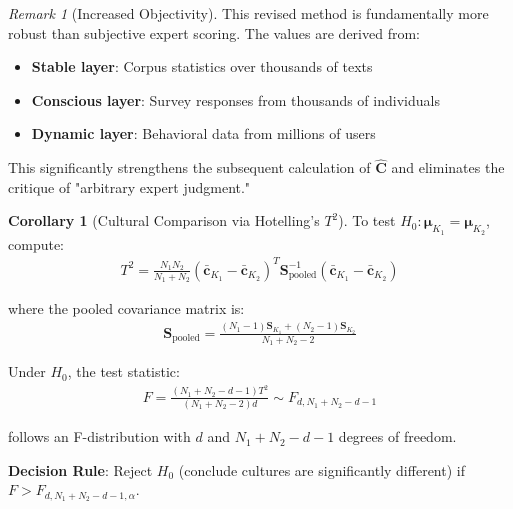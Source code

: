 \documentclass[11pt,a4paper]{article}
\theoremstyle{definition}
\newtheorem{corollary}{Corollary}[section]
\theoremstyle{remark}
\newtheorem{remark}{Remark}[section]
\newcommand{\cc}{\mathbf{c}}
\begin{document}
\begin{remark}[Increased Objectivity]
This revised method is fundamentally more robust than subjective expert scoring. The values are derived from:
\begin{itemize}
    \item \textbf{Stable layer}: Corpus statistics over thousands of texts
    \item \textbf{Conscious layer}: Survey responses from thousands of individuals
    \item \textbf{Dynamic layer}: Behavioral data from millions of users
\end{itemize}

This significantly strengthens the subsequent calculation of \(\hat{\mathbf{C}}\) and eliminates the critique of "arbitrary expert judgment."
\end{remark}

\begin{corollary}[Cultural Comparison via Hotelling's \(T^2\)]
To test \(H_0: \boldsymbol{\mu}_{K_1} = \boldsymbol{\mu}_{K_2}\), compute:
\begin{align}
T^2 = \frac{N_1 N_2}{N_1 + N_2}(\bar{\cc}_{K_1} - \bar{\cc}_{K_2})^T \mathbf{S}_{\text{pooled}}^{-1} (\bar{\cc}_{K_1} - \bar{\cc}_{K_2})
\end{align}

where the pooled covariance matrix is:
\begin{align}
\mathbf{S}_{\text{pooled}} = \frac{(N_1-1)\mathbf{S}_{K_1} + (N_2-1)\mathbf{S}_{K_2}}{N_1 + N_2 - 2}
\end{align}

Under \(H_0\), the test statistic:
\begin{align}
F = \frac{(N_1+N_2-d-1)T^2}{(N_1+N_2-2)d} \sim F_{d, N_1+N_2-d-1}
\end{align}

follows an F-distribution with \(d\) and \(N_1+N_2-d-1\) degrees of freedom.

\textbf{Decision Rule}: Reject \(H_0\) (conclude cultures are significantly different) if \(F > F_{d, N_1+N_2-d-1, \alpha}\).
\end{corollary}
\end{document}
